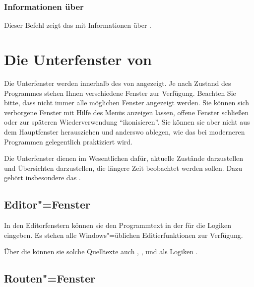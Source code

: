 {\subsection{Informationen über \mutabor}
\label{sec:MI_ABOUT}

Dieser Befehl zeigt das  mit Informationen 
über \mutabor{}.

\chapter{Die Unterfenster von \mutabor}\label{sec:DE_SUBWINDOW}

Die Unterfenster werden innerhalb des
 von \mutabor{}
angezeigt. Je nach Zustand des Programmes stehen Ihnen verschiedene
Fenster zur Verfügung. Beachten Sie bitte, dass nicht immer alle
möglichen Fenster angezeigt werden. Sie können sich verborgene Fenster
mit Hilfe des Menüs  anzeigen lassen, offene
Fenster schließen oder zur späteren Wiederverwendung
"`ikonisieren"'. Sie können sie aber nicht aus dem Hauptfenster
herausziehen und anderswo ablegen, wie das bei moderneren Programmen
gelegentlich praktiziert wird.

Die Unterfenster dienen im Wesentlichen dafür, aktuelle Zustände
darzustellen und Übersichten darzustellen, die längere Zeit beobachtet
werden sollen. Dazu gehört insbesondere das
.


\section{Editor"=Fenster}\label{sec:DE_EDIT}
In den Editorfenstern können sie den Programmtext in der
 für die Logiken eingeben.
Es stehen alle Windows"=üblichen Editierfunktionen zur Verfügung.

Über die  können sie solche
Quelltexte auch ,
,
 und als Logiken
.


\section{Routen"=Fenster}\label{sec:DE_ROUTES}
\label{sec:de_routes}

}
